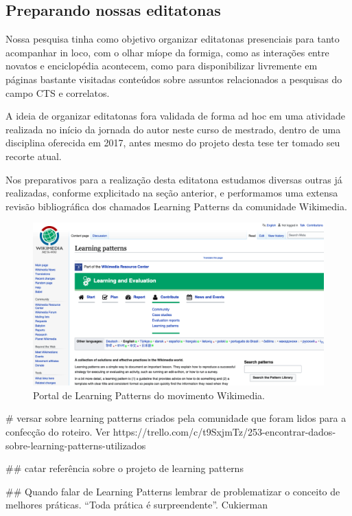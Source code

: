 \subsection{Preparando nossas editatonas}


Nossa pesquisa tinha como objetivo organizar editatonas presenciais para tanto acompanhar in loco, com o olhar míope da formiga, como as interações entre novatos e enciclopédia acontecem, como para disponibilizar livremente em páginas bastante visitadas conteúdos sobre assuntos relacionados a pesquisas do campo CTS e correlatos.

A ideia de organizar editatonas fora validada de forma ad hoc em uma atividade realizada no início da jornada do autor neste curso de mestrado, dentro de uma disciplina oferecida em 2017, antes mesmo do projeto desta tese ter tomado seu recorte atual.

Nos preparativos para a realização desta editatona estudamos diversas outras já realizadas, conforme explicitado na seção anterior, e performamos uma extensa revisão bibliográfica dos chamados Learning Patterns da comunidade Wikimedia.


\begin{figure}[H]
    \centering
    \includegraphics[width=1\textwidth]{Images/learning_patterns.png}
    \caption{Portal de Learning Patterns do movimento Wikimedia.}
    \label{fig:learning_patterns}
\end{figure}


# versar sobre learning patterns criados pela comunidade que foram lidos para a confecção do roteiro. Ver https://trello.com/c/t9SxjmTz/253-encontrar-dados-sobre-learning-patterns-utilizados

## catar referência sobre o projeto de learning patterns

## Quando falar de Learning Patterns lembrar de problematizar o conceito de melhores práticas. “Toda prática é surpreendente”. Cukierman

